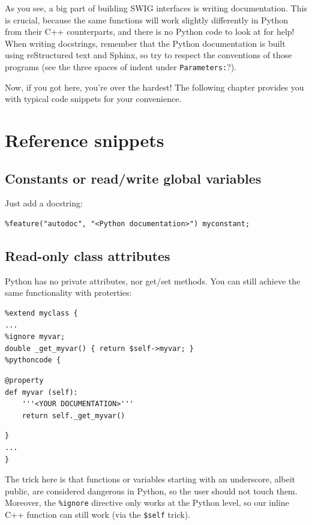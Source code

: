 \documentclass[12pt,a4paper,notitlepage,onecolumn]{article}
\begin{document}
As you see, a big part of building SWIG interfaces is writing documentation.
This is crucial, because the same functions will work slightly differently in
Python from their C++ counterparts, and there is no Python code to look at for
help! When
writing docstrings, remember that the Python documentation is built using
reStructured text and Sphinx, so try to respect the conventions of those
programs (see the three spaces of indent under \texttt{Parameters:}?).

Now, if you got here, you're over the hardest! The following chapter provides
you with typical code snippets for your convenience.

\section{Reference snippets}
\subsection{Constants or read/write global variables}
Just add a docstring:
\begin{verbatim}
%feature("autodoc", "<Python documentation>") myconstant;
\end{verbatim}

\subsection{Read-only class attributes}
Python has no private attributes, nor get/set methods. You can still achieve the
same functionality with proterties:
\begin{verbatim}
%extend myclass {
...
%ignore myvar;
double _get_myvar() { return $self->myvar; }
%pythoncode {
\end{verbatim}
\vspace{-3ex}
\begin{verbatim}
@property
def myvar (self):
    '''<YOUR DOCUMENTATION>'''
    return self._get_myvar()
\end{verbatim}
\vspace{-4ex}
\begin{verbatim}
}
...
}
\end{verbatim}
The trick here is that functions or variables starting with an underscore,
albeit public, are considered dangerous in Python, so the user should not touch
them. Moreover, the \texttt{\%ignore} directive only works at the Python level,
so our inline C++ function can still work (via the \texttt{\$self} trick).
\end{document}
